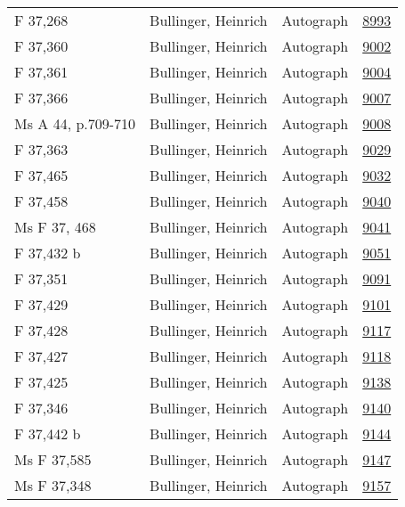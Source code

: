 \documentclass[10pt,a4paper,landscape]{report}
\begin{document}
\begin{longtable}{p{16cm}p{4cm}lr}
F 37,268	&	Bullinger, Heinrich	&	Autograph	&	\href{http://130.60.24.72/assignment/8993}{8993}\\
F 37,360	&	Bullinger, Heinrich	&	Autograph	&	\href{http://130.60.24.72/assignment/9002}{9002}\\
F 37,361	&	Bullinger, Heinrich	&	Autograph	&	\href{http://130.60.24.72/assignment/9004}{9004}\\
F 37,366	&	Bullinger, Heinrich	&	Autograph	&	\href{http://130.60.24.72/assignment/9007}{9007}\\
Ms A 44, p.709-710	&	Bullinger, Heinrich	&	Autograph	&	\href{http://130.60.24.72/assignment/9008}{9008}\\
F 37,363	&	Bullinger, Heinrich	&	Autograph	&	\href{http://130.60.24.72/assignment/9029}{9029}\\
F 37,465	&	Bullinger, Heinrich	&	Autograph	&	\href{http://130.60.24.72/assignment/9032}{9032}\\
F 37,458	&	Bullinger, Heinrich	&	Autograph	&	\href{http://130.60.24.72/assignment/9040}{9040}\\
Ms F 37, 468	&	Bullinger, Heinrich	&	Autograph	&	\href{http://130.60.24.72/assignment/9041}{9041}\\
F 37,432 b	&	Bullinger, Heinrich	&	Autograph	&	\href{http://130.60.24.72/assignment/9051}{9051}\\
F 37,351	&	Bullinger, Heinrich	&	Autograph	&	\href{http://130.60.24.72/assignment/9091}{9091}\\
F 37,429	&	Bullinger, Heinrich	&	Autograph	&	\href{http://130.60.24.72/assignment/9101}{9101}\\
F 37,428	&	Bullinger, Heinrich	&	Autograph	&	\href{http://130.60.24.72/assignment/9117}{9117}\\
F 37,427	&	Bullinger, Heinrich	&	Autograph	&	\href{http://130.60.24.72/assignment/9118}{9118}\\
F 37,425	&	Bullinger, Heinrich	&	Autograph	&	\href{http://130.60.24.72/assignment/9138}{9138}\\
F 37,346	&	Bullinger, Heinrich	&	Autograph	&	\href{http://130.60.24.72/assignment/9140}{9140}\\
F 37,442 b	&	Bullinger, Heinrich	&	Autograph	&	\href{http://130.60.24.72/assignment/9144}{9144}\\
Ms F 37,585	&	Bullinger, Heinrich	&	Autograph	&	\href{http://130.60.24.72/assignment/9147}{9147}\\
Ms F 37,348	&	Bullinger, Heinrich	&	Autograph	&	\href{http://130.60.24.72/assignment/9157}{9157}\\

\end{longtable}
\end{document}
